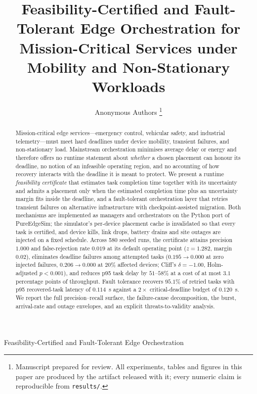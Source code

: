 \documentclass[journal,10pt]{IEEEtran}
\begin{document}
\title{Feasibility-Certified and Fault-Tolerant Edge Orchestration for
Mission-Critical Services under Mobility and Non-Stationary Workloads}

\author{Anonymous Authors%
\thanks{Manuscript prepared for review. All experiments, tables and figures
in this paper are produced by the artifact released with it; every numeric
claim is reproducible from \texttt{results/}.}}

%
{Feasibility-Certified and Fault-Tolerant Edge Orchestration}

\maketitle

\begin{abstract}
Mission-critical edge services---emergency control, vehicular safety, and
industrial telemetry---must meet hard deadlines under device mobility,
transient failures, and non-stationary load. Mainstream orchestration
minimises average delay or energy and therefore offers no runtime statement
about \emph{whether} a chosen placement can honour its deadline, no notion of
an infeasible operating region, and no accounting of how recovery interacts
with the deadline it is meant to protect. We present a runtime
\emph{feasibility certificate} that estimates task completion time together
with its uncertainty and admits a placement only when the estimated
completion time plus an uncertainty margin fits inside the deadline, and a
fault-tolerant orchestration layer that retries transient failures on
alternative infrastructure with checkpoint-assisted migration. Both
mechanisms are implemented as managers and orchestrators on the Python port
of PureEdgeSim; the simulator's per-device placement cache is invalidated so
that every task is certified, and device kills, link drops, battery drains
and site outages are injected on a fixed schedule. Across 580 seeded runs,
the certificate attains precision $1.000$ and false-rejection rate $0.019$ at
its default operating point ($z=1.282$, margin $0.02$), eliminates deadline
failures among attempted tasks ($0.195\!\to\!0.000$ at zero injected
failures, $0.206\!\to\!0.000$ at $20\%$ affected devices; Cliff's
$\delta=-1.00$, Holm-adjusted $p<0.001$), and reduces p95 task delay by
$51$--$58\%$ at a cost of at most $3.1$ percentage points of throughput. Fault
tolerance recovers $95.1\%$ of retried tasks with p95 recovered-task latency
of $0.114$~s against a $2\times$ critical-deadline budget of $0.120$~s. We
report the full precision--recall surface, the failure-cause decomposition,
the burst, arrival-rate and outage envelopes, and an explicit threats-to-validity
analysis.
\end{abstract}
\end{document}
